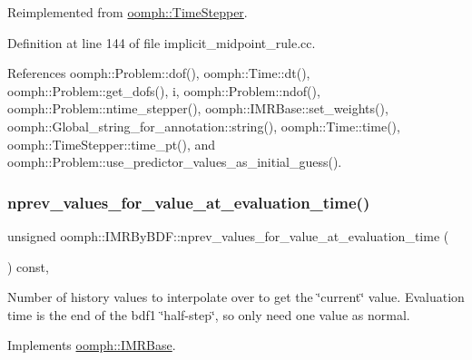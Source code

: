 Reimplemented from \hyperlink{classoomph_1_1TimeStepper_a36cbcee0c1127085ba3aa2331bfc0f74}{oomph\+::\+Time\+Stepper}.



Definition at line 144 of file implicit\+\_\+midpoint\+\_\+rule.\+cc.



References oomph\+::\+Problem\+::dof(), oomph\+::\+Time\+::dt(), oomph\+::\+Problem\+::get\+\_\+dofs(), i, oomph\+::\+Problem\+::ndof(), oomph\+::\+Problem\+::ntime\+\_\+stepper(), oomph\+::\+I\+M\+R\+Base\+::set\+\_\+weights(), oomph\+::\+Global\+\_\+string\+\_\+for\+\_\+annotation\+::string(), oomph\+::\+Time\+::time(), oomph\+::\+Time\+Stepper\+::time\+\_\+pt(), and oomph\+::\+Problem\+::use\+\_\+predictor\+\_\+values\+\_\+as\+\_\+initial\+\_\+guess().

\mbox{\label{classoomph_1_1IMRByBDF_a4fb7f902b1a266b19cfdfe640d4c78d5}} 
\subsubsection{\texorpdfstring{nprev\+\_\+values\+\_\+for\+\_\+value\+\_\+at\+\_\+evaluation\+\_\+time()}{nprev\_values\_for\_value\_at\_evaluation\_time()}}
{\footnotesize\ttfamily unsigned oomph\+::\+I\+M\+R\+By\+B\+D\+F\+::nprev\+\_\+values\+\_\+for\+\_\+value\+\_\+at\+\_\+evaluation\+\_\+time (\begin{DoxyParamCaption}{ }\end{DoxyParamCaption}) const\hspace{0.3cm}{\ttfamily [inline]}, {\ttfamily [virtual]}}



Number of history values to interpolate over to get the \char`\"{}current\char`\"{} value. Evaluation time is the end of the bdf1 \char`\"{}half-\/step\char`\"{}, so only need one value as normal. 



Implements \hyperlink{classoomph_1_1IMRBase_a93df756c834f8ba27956b8efb2af3636}{oomph\+::\+I\+M\+R\+Base}.



